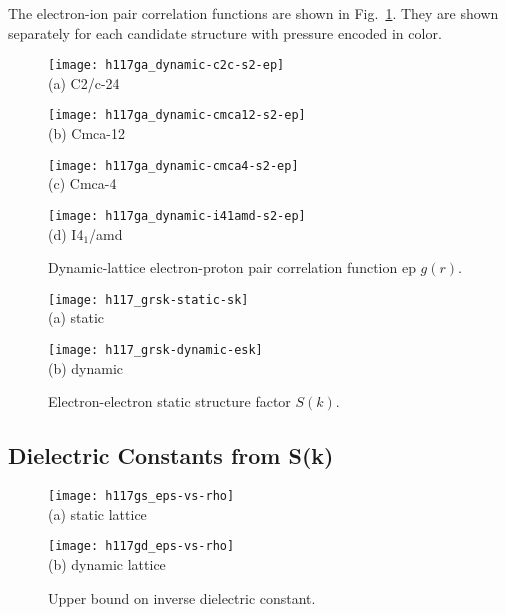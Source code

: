 The electron-ion pair correlation functions are shown in Fig.~\ref{fig:hsolid-epgr}.
They are shown separately for each candidate structure with pressure encoded in color.


\begin{figure}[h]
\centering
\begin{minipage}{0.49\textwidth}
\centering
\texttt{[image: h117ga\_dynamic-c2c-s2-ep]}\\
(a) C2/c-24
\end{minipage}
\begin{minipage}{0.49\textwidth}
\centering
\texttt{[image: h117ga\_dynamic-cmca12-s2-ep]}\\
(b) Cmca-12
\end{minipage}
\begin{minipage}{0.49\textwidth}
\centering
\texttt{[image: h117ga\_dynamic-cmca4-s2-ep]}\\
(c) Cmca-4
\end{minipage}
\begin{minipage}{0.49\textwidth}
\centering
\texttt{[image: h117ga\_dynamic-i41amd-s2-ep]}\\
(d) I4$_1$/amd
\end{minipage}
\caption{Dynamic-lattice electron-proton pair correlation function ep $g(r)$.}
\label{fig:hsolid-epgr}
\end{figure}


\begin{figure}[h]
\centering
\begin{minipage}{0.49\textwidth}
\centering
\texttt{[image: h117\_grsk-static-sk]}\\
(a) static
\end{minipage}
\begin{minipage}{0.49\textwidth}
\centering
\texttt{[image: h117\_grsk-dynamic-esk]}\\
(b) dynamic
\end{minipage}
\caption{Electron-electron static structure factor $S(k)$.}
\label{fig:hsolid-esk}
\end{figure}

\subsection{Dielectric Constants from S(k)}

\begin{figure}[h]
\centering
\begin{minipage}{0.49\textwidth}
\centering
\texttt{[image: h117gs\_eps-vs-rho]}\\
(a) static lattice
\end{minipage}
\begin{minipage}{0.49\textwidth}
\centering
\texttt{[image: h117gd\_eps-vs-rho]}\\
(b) dynamic lattice
\end{minipage}
\caption{Upper bound on inverse dielectric constant.}
\label{fig:hsolid-epsinv}
\end{figure}

